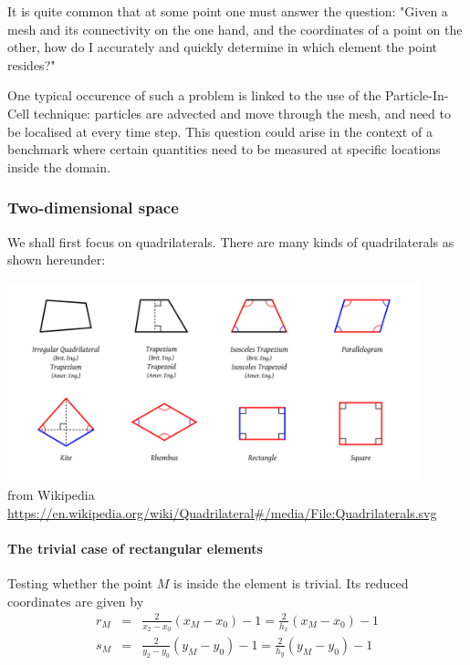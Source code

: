 
It is quite common that at some point one must answer the question:
"Given a mesh and its connectivity on the one hand, and the coordinates of a 
point on the other, how do I accurately and quickly determine in which element 
the point resides?"

One typical occurence of such a problem is linked to the use of the Particle-In-Cell 
technique: particles are advected and move through the mesh, and need to be localised 
at every time step. This question could arise in the context of a benchmark where 
certain quantities need to be measured at specific locations inside the domain. 

\subsubsection{Two-dimensional space}

We shall first focus on quadrilaterals. There are many kinds of quadrilaterals as shown 
hereunder: 

\begin{center}
\includegraphics[width=12cm]{images/quadrilaterals} \\
{\captionfont from Wikipedia \url{https://en.wikipedia.org/wiki/Quadrilateral#/media/File:Quadrilaterals.svg}}
\end{center}



\paragraph{The trivial case of rectangular elements} 

Testing whether the point $M$ is inside the element is trivial. Its reduced coordinates
are given by
\begin{eqnarray}
r_M &=& \frac{2}{x_2-x_0}(x_M-x_0) -1 = \frac{2}{h_x}(x_M-x_0)-1  \\
s_M &=& \frac{2}{y_2-y_0}(y_M-y_0) -1 = \frac{2}{h_y}(y_M-y_0)-1  
\end{eqnarray}

